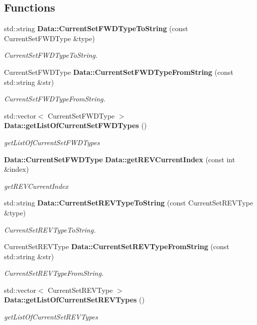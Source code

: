 \subsection*{Functions}
\begin{DoxyCompactItemize}
\item 
std\+::string \textbf{ Data\+::\+Current\+Set\+F\+W\+D\+Type\+To\+String} (const Current\+Set\+F\+W\+D\+Type \&type)
\begin{DoxyCompactList}\small\item\em Current\+Set\+F\+W\+D\+Type\+To\+String. \end{DoxyCompactList}\item 
Current\+Set\+F\+W\+D\+Type \textbf{ Data\+::\+Current\+Set\+F\+W\+D\+Type\+From\+String} (const std\+::string \&str)
\begin{DoxyCompactList}\small\item\em Current\+Set\+F\+W\+D\+Type\+From\+String. \end{DoxyCompactList}\item 
std\+::vector$<$ Current\+Set\+F\+W\+D\+Type $>$ \textbf{ Data\+::get\+List\+Of\+Current\+Set\+F\+W\+D\+Types} ()
\begin{DoxyCompactList}\small\item\em get\+List\+Of\+Current\+Set\+F\+W\+D\+Types \end{DoxyCompactList}\item 
\textbf{ Data\+::\+Current\+Set\+F\+W\+D\+Type} \textbf{ Data\+::get\+R\+E\+V\+Current\+Index} (const int \&index)
\begin{DoxyCompactList}\small\item\em get\+R\+E\+V\+Current\+Index \end{DoxyCompactList}\item 
std\+::string \textbf{ Data\+::\+Current\+Set\+R\+E\+V\+Type\+To\+String} (const Current\+Set\+R\+E\+V\+Type \&type)
\begin{DoxyCompactList}\small\item\em Current\+Set\+R\+E\+V\+Type\+To\+String. \end{DoxyCompactList}\item 
Current\+Set\+R\+E\+V\+Type \textbf{ Data\+::\+Current\+Set\+R\+E\+V\+Type\+From\+String} (const std\+::string \&str)
\begin{DoxyCompactList}\small\item\em Current\+Set\+R\+E\+V\+Type\+From\+String. \end{DoxyCompactList}\item 
std\+::vector$<$ Current\+Set\+R\+E\+V\+Type $>$ \textbf{ Data\+::get\+List\+Of\+Current\+Set\+R\+E\+V\+Types} ()
\begin{DoxyCompactList}\small\item\em get\+List\+Of\+Current\+Set\+R\+E\+V\+Types \end{DoxyCompactList}\end{DoxyCompactItemize}
